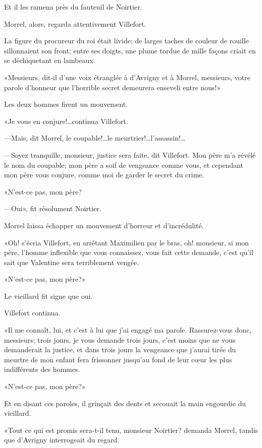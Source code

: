 Et il les ramena près du fauteuil de Noirtier. 

Morrel, alors, regarda attentivement Villefort. 

La figure du procureur du roi était livide; de larges taches de couleur de rouille sillonnaient son front; entre ses doigts, une plume tordue de mille façons criait en se déchiquetant en lambeaux. 

«Messieurs, dit-il d'une voix étranglée à d'Avrigny et à Morrel, messieurs, votre parole d'honneur que l'horrible secret demeurera enseveli entre nous!» 

Les deux hommes firent un mouvement. 

«Je vous en conjure!\dots continua Villefort. 

—Mais, dit Morrel, le coupable!\dots le meurtrier!\dots l'assassin!\dots 

—Soyez tranquille, monsieur, justice sera faite, dit Villefort. Mon père m'a révélé le nom du coupable; mon père a soif de vengeance comme vous, et cependant mon père vous conjure, comme moi de garder le secret du crime. 

«N'est-ce pas, mon père? 

—Oui», fit résolument Noirtier. 

Morrel laissa échapper un mouvement d'horreur et d'incrédulité. 

«Oh! s'écria Villefort, en arrêtant Maximilien par le bras, oh! monsieur, si mon père, l'homme inflexible que vous connaissez, vous fait cette demande, c'est qu'il sait que Valentine sera terriblement vengée. 

«N'est-ce pas, mon père?» 

Le vieillard fit signe que oui. 

Villefort continua. 

«Il me connaît, lui, et c'est à lui que j'ai engagé ma parole. Rassurez-vous donc, messieurs; trois jours, je vous demande trois jours, c'est moins que ne vous demanderait la justice, et dans trois jours la vengeance que j'aurai tirée du meurtre de mon enfant fera frissonner jusqu'au fond de leur cœur les plus indifférents des hommes. 

«N'est-ce pas, mon père?» 

Et en disant ces paroles, il grinçait des dents et secouait la main engourdie du vieillard. 

«Tout ce qui est promis sera-t-il tenu, monsieur Noirtier? demanda Morrel, tandis que d'Avrigny interrogeait du regard. 

